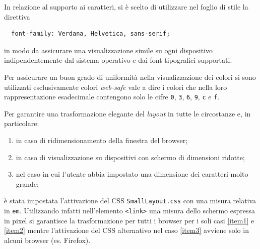 \documentclass[10pt,a4paper,onecolumn]{article}
\newcommand{\inglese}[1]{\foreignlanguage{english}{\itshape{}#1}}
\begin{document}
In relazione al supporto ai caratteri, si è scelto di utilizzare nel foglio di stile la direttiva
\begin{verbatim}
  font-family: Verdana, Helvetica, sans-serif;
\end{verbatim}
in modo da assicurare una visualizzazione simile su ogni dispositivo indipendentemente dal sistema operativo e dai font tipografici supportati.

Per assicurare un buon grado di uniformità nella visualizzazione dei colori si sono utilizzati esclusivamente colori \inglese{web-safe} vale a dire i colori che nella loro rappresentazione esadecimale contengono solo le cifre \verb+0+, \verb+3+, \verb+6+, \verb+9+, \verb+c+ e \verb+f+.

Per garantire una trasformazione elegante del \inglese{layout} in tutte le circostanze e, in particolare:
\begin{enumerate}[noitemsep,nolistsep,label=\emph{\alph*})]
  \item\label{item1} in caso di ridimensionamento della finestra del browser;
  \item\label{item2} in caso di visualizzazione su dispositivi con schermo di dimensioni ridotte;
  \item\label{item3} nel caso in cui l'utente abbia impostato una dimensione dei caratteri molto grande;
\end{enumerate}
è stata impostata l'attivazione del CSS \texttt{SmallLayout.css} con una misura relativa in \texttt{em}. Utilizzando infatti nell'elemento \texttt{<link>} una misura dello schermo espressa in pixel si garantisce la trasformazione per tutti i browser per i soli casi \ref{item1} e \ref{item2} mentre l'attivazione del CSS alternativo nel caso \ref{item3} avviene solo in alcuni browser (es. Firefox).
\end{document}
